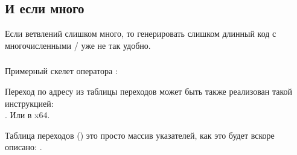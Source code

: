 \subsection{И если много}

Если ветвлений слишком много, то генерировать слишком длинный код с многочисленными \JE/\JNE 
уже не так удобно.







\subsubsection{\Conclusion{}}

Примерный скелет оператора :



Переход по адресу из таблицы переходов может быть также реализован такой инструкцией: \\
. Или  в x64.

Таблица переходов () это просто массив указателей, как это будет вскоре описано: .

